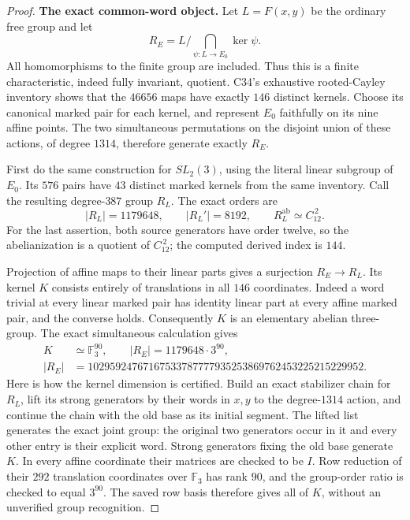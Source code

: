 \begin{proof}
\textbf{The exact common-word object.}\quad
Let $L=F(x,y)$ be the ordinary free group and let
\[
 R_E=L/\bigcap_{\psi:L\to E_0}\ker\psi.
\]
All homomorphisms to the finite group are included.
Thus this is a finite characteristic, indeed fully invariant,
quotient. C34's exhaustive rooted-Cayley inventory shows
that the $46656$ maps have exactly $146$ distinct kernels.
Choose its canonical marked pair for each kernel, and
represent $E_0$ faithfully on its nine affine points.
The two simultaneous permutations on the disjoint union
of these actions, of degree $1314$, therefore generate
exactly $R_E$.

First do the same construction for $SL_2(3)$, using the
literal linear subgroup of $E_0$. Its $576$ pairs have
$43$ distinct marked kernels from the same inventory.
Call the resulting degree-$387$ group $R_L$. The exact
orders are
\[
 |R_L|=1179648,\qquad |R_L'|=8192,
 \qquad R_L^{\mathrm{ab}}\simeq C_{12}^{\,2}.
                                                        \tag{D23.H12.2}
\]
For the last assertion, both source generators have order
twelve, so the abelianization is a quotient of
$C_{12}^{\,2}$; the computed derived index is $144$.

Projection of affine maps to their linear parts gives a
surjection $R_E\to R_L$. Its kernel $K$ consists entirely
of translations in all $146$ coordinates. Indeed a word
trivial at every linear marked pair has identity linear
part at every affine marked pair, and the converse holds.
Consequently $K$ is an elementary abelian three-group.
The exact simultaneous calculation gives
\[
 \begin{split}
 K&\simeq\mathbb F_3^{90},\qquad |R_E|=1179648\cdot3^{90},\\
 |R_E|&=10295924767167533787777935253869762453225215229952.
 \end{split}
                                                        \tag{D23.H12.3}
\]
Here is how the kernel dimension is certified. Build an
exact stabilizer chain for $R_L$, lift its strong generators
by their words in $x,y$ to the degree-$1314$ action, and
continue the chain with the old base as its initial segment.
The lifted list generates the exact joint group: the original
two generators occur in it and every other entry is their
explicit word. Strong generators fixing the old base
generate $K$. In every affine coordinate their matrices
are checked to be $I$. Row reduction of their $292$
translation coordinates over $\mathbb F_3$ has rank $90$,
and the group-order ratio is checked to equal $3^{90}$.
The saved row basis therefore gives all of $K$, without
an unverified group recognition.


\end{proof}
